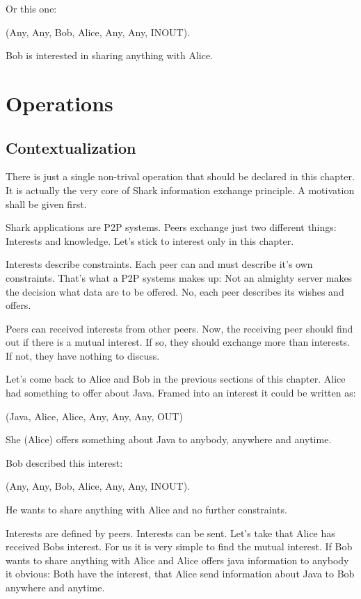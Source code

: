 Or this one:

(Any, Any, Bob, Alice, Any, Any, INOUT).

Bob is interested in sharing anything with Alice.

\section{Operations}
\subsection{Contextualization}
There is just a single non-trival operation that should be declared in this chapter. It is actually the very core of Shark information exchange principle. A motivation shall be given first.

Shark applications are P2P systems. Peers exchange just two different things: Interests and knowledge. Let's stick to interest only in this chapter. 

Interests describe constraints. Each peer can and must describe it's own constraints. That's what a P2P systems makes up: Not an almighty server makes the decision what data are to be offered. No, each peer describes its wishes and offers.

Peers can received interests from other peers. Now, the receiving peer should  find out if there is a mutual interest. If so, they should exchange more than interests. If not, they have nothing to discuss.

Let's come back to Alice and Bob in the previous sections of this chapter. Alice had something to offer about Java. Framed into an interest it could be written as:

(Java, Alice, Alice, Any, Any, Any, OUT)

She (Alice) offers something about Java to anybody, anywhere and anytime.

Bob described this interest:

(Any, Any, Bob, Alice, Any, Any, INOUT).

He wants to share anything with Alice and no further constraints.

Interests are defined by peers. Interests can be sent. Let's take that Alice has received Bobs interest. For us it is very simple to find the mutual interest. If Bob wants to share anything with Alice and Alice offers java information to anybody it obvious: Both have the interest, that Alice send information about Java to Bob anywhere and anytime.

